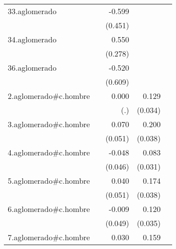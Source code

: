 {\begin{longtable}{l*{4}{D{.}{.}{-1}}}
\addlinespace
33.aglomerado&                     &      -0.599         &                     &                     \\
            &                     &     (0.451)         &                     &                     \\
\addlinespace
34.aglomerado&                     &       0.550\sym{*}  &                     &                     \\
            &                     &     (0.278)         &                     &                     \\
\addlinespace
36.aglomerado&                     &      -0.520         &                     &                     \\
            &                     &     (0.609)         &                     &                     \\
\addlinespace
2.aglomerado#c.hombre&                     &       0.000         &       0.129\sym{***}&                     \\
            &                     &         (.)         &     (0.034)         &                     \\
\addlinespace
3.aglomerado#c.hombre&                     &       0.070         &       0.200\sym{***}&                     \\
            &                     &     (0.051)         &     (0.038)         &                     \\
\addlinespace
4.aglomerado#c.hombre&                     &      -0.048         &       0.083\sym{**} &                     \\
            &                     &     (0.046)         &     (0.031)         &                     \\
\addlinespace
5.aglomerado#c.hombre&                     &       0.040         &       0.174\sym{***}&                     \\
            &                     &     (0.051)         &     (0.038)         &                     \\
\addlinespace
6.aglomerado#c.hombre&                     &      -0.009         &       0.120\sym{***}&                     \\
            &                     &     (0.049)         &     (0.035)         &                     \\
\addlinespace
7.aglomerado#c.hombre&                     &       0.030         &       0.159\sym{***}&                     \\

\end{longtable}}
